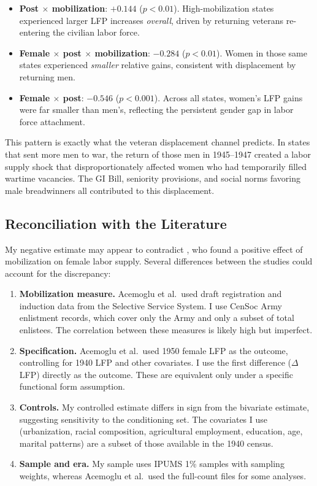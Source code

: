 \documentclass[12pt]{article}
\begin{document}
\begin{itemize}
\item \textbf{Post $\times$ mobilization}: $+0.144$ ($p < 0.01$). High-mobilization states experienced larger LFP increases \textit{overall}, driven by returning veterans re-entering the civilian labor force.

\item \textbf{Female $\times$ post $\times$ mobilization}: $-0.284$ ($p < 0.01$). Women in those same states experienced \textit{smaller} relative gains, consistent with displacement by returning men.

\item \textbf{Female $\times$ post}: $-0.546$ ($p < 0.001$). Across all states, women's LFP gains were far smaller than men's, reflecting the persistent gender gap in labor force attachment.
\end{itemize}

This pattern is exactly what the veteran displacement channel predicts. In states that sent more men to war, the return of those men in 1945--1947 created a labor supply shock that disproportionately affected women who had temporarily filled wartime vacancies. The GI Bill, seniority provisions, and social norms favoring male breadwinners all contributed to this displacement.

\subsection{Reconciliation with the Literature}

My negative estimate may appear to contradict \citet{acemoglu2004women}, who found a positive effect of mobilization on female labor supply. Several differences between the studies could account for the discrepancy:

\begin{enumerate}
\item \textbf{Mobilization measure.} Acemoglu et al.\ used draft registration and induction data from the Selective Service System. I use CenSoc Army enlistment records, which cover only the Army and only a subset of total enlistees. The correlation between these measures is likely high but imperfect.

\item \textbf{Specification.} Acemoglu et al.\ used 1950 female LFP as the outcome, controlling for 1940 LFP and other covariates. I use the first difference ($\Delta$ LFP) directly as the outcome. These are equivalent only under a specific functional form assumption.

\item \textbf{Controls.} My controlled estimate differs in sign from the bivariate estimate, suggesting sensitivity to the conditioning set. The covariates I use (urbanization, racial composition, agricultural employment, education, age, marital patterns) are a subset of those available in the 1940 census.

\item \textbf{Sample and era.} My sample uses IPUMS 1\% samples with sampling weights, whereas Acemoglu et al.\ used the full-count files for some analyses.
\end{enumerate}
\end{document}
